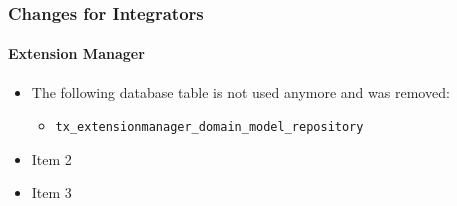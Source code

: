 %

\begin{frame}[fragile]
	\frametitle{Changes for Integrators}
	\framesubtitle{Extension Manager}

	\begin{itemize}
		\item The following database table is not used anymore and was removed:
			\begin{itemize}\smaller
				\item \texttt{tx\_extensionmanager\_domain\_model\_repository}
			\end{itemize}\normalsize
			\vspace{0.4cm}

		\item Item 2
		\item Item 3
	\end{itemize}

\end{frame}

